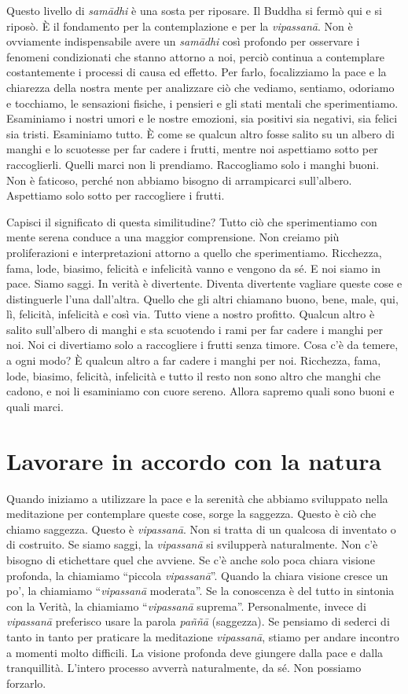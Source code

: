Questo livello di \emph{samādhi} è una sosta per riposare. Il Buddha si
fermò qui e si riposò. È il fondamento per la contemplazione e per la
\emph{vipassanā}. Non è ovviamente indispensabile avere un
\emph{samādhi} così profondo per osservare i fenomeni condizionati che
stanno attorno a noi, perciò continua a contemplare costantemente i
processi di causa ed effetto. Per farlo, focalizziamo la pace e la
chiarezza della nostra mente per analizzare ciò che vediamo, sentiamo,
odoriamo e tocchiamo, le sensazioni fisiche, i pensieri e gli stati
mentali che sperimentiamo. Esaminiamo i nostri umori e le nostre
emozioni, sia positivi sia negativi, sia felici sia tristi. Esaminiamo
tutto. È come se qualcun altro fosse salito su un albero di manghi e lo
scuotesse per far cadere i frutti, mentre noi aspettiamo sotto per
raccoglierli. Quelli marci non li prendiamo. Raccogliamo solo i manghi
buoni. Non è faticoso, perché non abbiamo bisogno di arrampicarci
sull'albero. Aspettiamo solo sotto per raccogliere i frutti.

Capisci il significato di questa similitudine? Tutto ciò che
sperimentiamo con mente serena conduce a una maggior comprensione. Non
creiamo più proliferazioni e interpretazioni attorno a quello che
sperimentiamo. Ricchezza, fama, lode, biasimo, felicità e infelicità
vanno e vengono da sé. E noi siamo in pace. Siamo saggi. In verità è
divertente. Diventa divertente vagliare queste cose e distinguerle l'una
dall'altra. Quello che gli altri chiamano buono, bene, male, qui, lì,
felicità, infelicità e così via. Tutto viene a nostro profitto. Qualcun
altro è salito sull'albero di manghi e sta scuotendo i rami per far
cadere i manghi per noi. Noi ci divertiamo solo a raccogliere i frutti
senza timore. Cosa c'è da temere, a ogni modo? È qualcun altro a far
cadere i manghi per noi. Ricchezza, fama, lode, biasimo, felicità,
infelicità e tutto il resto non sono altro che manghi che cadono, e noi
li esaminiamo con cuore sereno. Allora sapremo quali sono buoni e quali
marci.

\section{Lavorare in accordo con la natura}

Quando iniziamo a utilizzare la pace e la serenità che abbiamo
sviluppato nella meditazione per contemplare queste cose, sorge la
saggezza. Questo è ciò che chiamo saggezza. Questo è \emph{vipassanā}.
Non si tratta di un qualcosa di inventato o di costruito. Se siamo
saggi, la \emph{vipassanā} si svilupperà naturalmente. Non c'è bisogno
di etichettare quel che avviene. Se c'è anche solo poca chiara visione
profonda, la chiamiamo ``piccola \emph{vipassanā}''. Quando la chiara
visione cresce un po', la chiamiamo ``\emph{vipassanā} moderata''. Se la
conoscenza è del tutto in sintonia con la Verità, la chiamiamo
``\emph{vipassanā} suprema''. Personalmente, invece di \emph{vipassanā}
preferisco usare la parola \emph{paññā} (saggezza). Se pensiamo di
sederci di tanto in tanto per praticare la meditazione \emph{vipassanā},
stiamo per andare incontro a momenti molto difficili. La visione
profonda deve giungere dalla pace e dalla tranquillità. L'intero
processo avverrà naturalmente, da sé. Non possiamo forzarlo.

